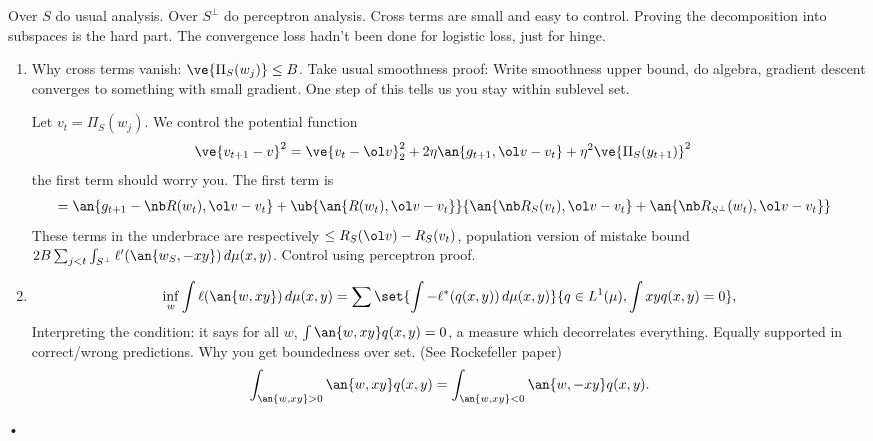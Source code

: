 Over $S$ do usual analysis.
Over $S^{\perp}$ do perceptron analysis.
Cross terms are small and easy to control. 
Proving the decomposition into subspaces is the hard part.
The convergence loss hadn't been done for logistic loss, just for hinge.



\begin{enumerate}
\item
Why cross terms vanish: $\ve{\Pi_S(w_j)}\le B$. 
Take usual smoothness proof: Write smoothness upper bound, do algebra, gradient descent converges to something with small gradient. One step of this tells us you stay within sublevel set.

Let $v_t = \Pi_S(w_j)$.
We control the potential function 
\begin{align}
\ve{v_{t+1}-v}^2 &= \ve{v_t-\ol v}_2^2 + 2\eta \an{g_{t+1}, \ol v-v_t} + \eta^2\ve{\Pi_S(y_{t+1})}^2
\end{align}
the first term should worry you.
The first term is
\begin{align}
&=\an{g_{t+1} - \nb R(w_t), \ol v-v_t}
+ \ub{\an{R(w_t), \ol v-v_t}}{\an{\nb R_S(v_t), \ol v-v_t}+ \an{\nb R_{S^{\perp}} (w_t), \ol v-v_t}}
\end{align}
These terms in the underbrace are respectively $\le R_S(\ol v) - R_S(v_t)$, population version of mistake bound $2B\sum_{j<t} \int_{S^{\perp}} \ell'(\an{w_{S}, -xy})\,d\mu(x,y)$. Control using perceptron proof.
\item
\begin{align}
\inf_w \int \ell(\an{w,xy})\,d\mu(x,y)
=
\sum\set{\int -\ell^*(q(x,y))\,d\mu(x,y)}{q\in L^1(\mu), \int xyq(x,y)=0},
\end{align}
Interpreting the condition: it says for all $w$, $\int\an{w,xy} q(x,y)=0$, a measure which decorrelates everything. Equally supported in correct/wrong predictions. Why you get boundedness over set. %
(See Rockefeller paper)
$$\int_{\an{w,xy}>0} \an{w,xy}q(x,y) = \int_{\an{w,xy}<0}\an{w,-xy}q(x,y).
$$ 
\end{enumerate}•

\printbibliography
